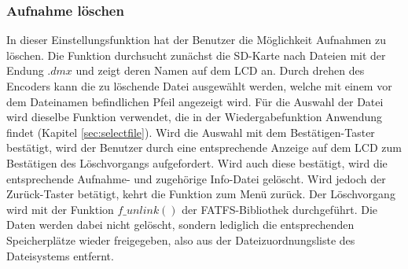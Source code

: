 \subsubsection{Aufnahme löschen}
In dieser Einstellungsfunktion hat der Benutzer die Möglichkeit Aufnahmen zu löschen. Die Funktion durchsucht zunächst die SD-Karte nach Dateien mit der Endung $.dmx$ und zeigt deren Namen auf dem LCD an. Durch drehen des Encoders kann die zu löschende Datei ausgewählt werden, welche mit einem vor dem Dateinamen befindlichen Pfeil angezeigt wird. Für die Auswahl der Datei wird dieselbe Funktion verwendet, die in der Wiedergabefunktion Anwendung findet (Kapitel \ref{sec:selectfile}). Wird die Auswahl mit dem Bestätigen-Taster bestätigt, wird der Benutzer durch eine entsprechende Anzeige auf dem LCD zum Bestätigen des Löschvorgangs aufgefordert. Wird auch diese bestätigt, wird die entsprechende Aufnahme- und zugehörige Info-Datei gelöscht. Wird jedoch der Zurück-Taster betätigt, kehrt die Funktion zum Menü zurück. Der Löschvorgang wird mit der Funktion $f\_unlink()$ der FATFS-Bibliothek durchgeführt. Die Daten werden dabei nicht gelöscht, sondern lediglich die entsprechenden Speicherplätze wieder freigegeben, also aus der Dateizuordnungsliste des Dateisystems entfernt.